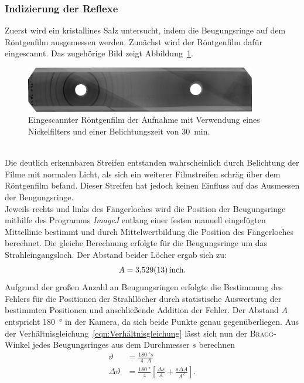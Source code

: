 \documentclass[a4paper,twoside,final]{article}
\begin{document}
\subsubsection{Indizierung der Reflexe}
Zuerst wird ein kristallines Salz untersucht, indem die Beugungsringe auf dem Röntgenfilm ausgemessen werden. Zunächst wird der Röntgenfilm dafür eingescannt. Das zugehörige Bild zeigt Abbildung~\ref{fig:Film_mitFilter}.
\begin{figure}[htp]
    \centering
        \includegraphics[width=0.9\textwidth]{Abbildungen/Roentgenfilm_mit_Filter.jpg}
    \caption{Eingescannter Röntgenfilm der Aufnahme mit Verwendung eines Nickelfilters und einer Belichtungszeit von \SI{30}{\minute}.}
    \label{fig:Film_mitFilter}
\end{figure}\\
Die deutlich erkennbaren Streifen entstanden wahrscheinlich durch Belichtung der Filme mit normalen Licht, als sich ein weiterer Filmstreifen schräg über dem Röntgenfilm befand. Dieser Streifen hat jedoch keinen Einfluss auf das Ausmessen der Beugungsringe.\\
Jeweils rechts und links des Fängerloches wird die Position der Beugungsringe mithilfe des Programms \textit{ImageJ} entlang einer festen manuell eingefügten Mittellinie bestimmt und durch Mittelwertbildung die Position des Fängerloches berechnet. Die gleiche Berechnung erfolgte für die Beugungsringe um das Strahleingangsloch. Der Abstand beider Löcher ergab sich zu:
\begin{align}
  A = \SI{3,529\pm 0,013}{\text{inch}}.
\end{align}
Aufgrund der großen Anzahl an Beugungsringen erfolgte die Bestimmung des Fehlers für die Positionen der Strahllöcher durch statistische Auswertung der bestimmten Positionen und anschließende Addition der Fehler. Der Abstand $A$ entspricht \SI{180}{\degree} in der Kamera, da sich beide Punkte genau gegenüberliegen. Aus der Verhältnisgleichung~\eqref{eqn:Verhältnisgleichung} lässt sich nun der \textsc{Bragg}-Winkel jedes Beugungsringes aus dem Durchmesser $s$ berechnen
\begin{align}
  \vartheta &= \frac{\SI{180}{\degree}s}{4\cdot A}\\
  \Delta \vartheta &= \frac{\SI{180}{\degree}}{4}\left[\frac{\Delta s}{A} + \frac{s\Delta A}{A^2}\right].
\end{align}
\end{document}
